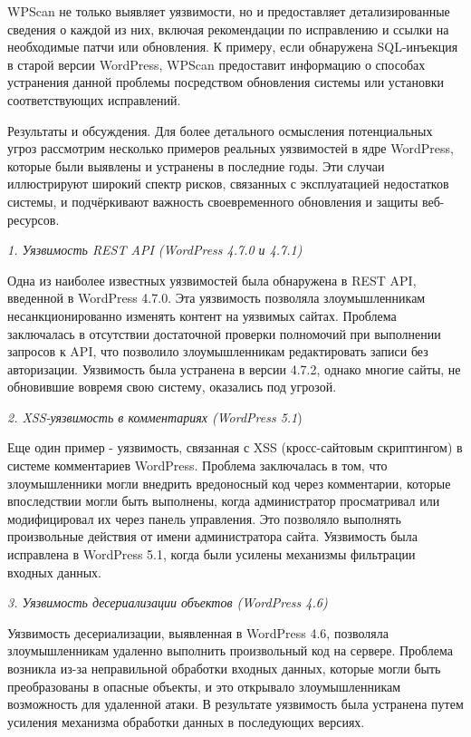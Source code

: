 \documentclass[
]{article}
\begin{document}
WPScan не только выявляет уязвимости, но и предоставляет
детализированные сведения о каждой из них, включая рекомендации по
исправлению и ссылки на необходимые патчи или обновления. К примеру,
если обнаружена SQL-инъекция в старой версии WordPress, WPScan
предоставит информацию о способах устранения данной проблемы посредством
обновления системы или установки соответствующих исправлений.

Результаты и обсуждения. Для более детального осмысления потенциальных
угроз рассмотрим несколько примеров реальных уязвимостей в ядре
WordPress, которые были выявлены и устранены в последние годы. Эти
случаи иллюстрируют широкий спектр рисков, связанных с эксплуатацией
недостатков системы, и подчёркивают важность своевременного обновления и
защиты веб-ресурсов.

\emph{1. Уязвимость REST API (WordPress 4.7.0 и 4.7.1)}

Одна из наиболее известных уязвимостей была обнаружена в REST API,
введенной в WordPress 4.7.0. Эта уязвимость позволяла злоумышленникам
несанкционированно изменять контент на уязвимых сайтах. Проблема
заключалась в отсутствии достаточной проверки полномочий при выполнении
запросов к API, что позволило злоумышленникам редактировать записи без
авторизации. Уязвимость была устранена в версии 4.7.2, однако многие
сайты, не обновившие вовремя свою систему, оказались под угрозой.

\emph{2. XSS-уязвимость в комментариях (WordPress 5.1})

Еще один пример - уязвимость, связанная с XSS (кросс-сайтовым
скриптингом) в системе комментариев WordPress. Проблема заключалась в
том, что злоумышленники могли внедрить вредоносный код через
комментарии, которые впоследствии могли быть выполнены, когда
администратор просматривал или модифицировал их через панель управления.
Это позволяло выполнять произвольные действия от имени администратора
сайта. Уязвимость была исправлена в WordPress 5.1, когда были усилены
механизмы фильтрации входных данных.

\emph{3. Уязвимость десериализации объектов (WordPress 4.6)}

Уязвимость десериализации, выявленная в WordPress 4.6, позволяла
злоумышленникам удаленно выполнить произвольный код на сервере. Проблема
возникла из-за неправильной обработки входных данных, которые могли быть
преобразованы в опасные объекты, и это открывало злоумышленникам
возможность для удаленной атаки. В результате уязвимость была устранена
путем усиления механизма обработки данных в последующих версиях.
\end{document}
